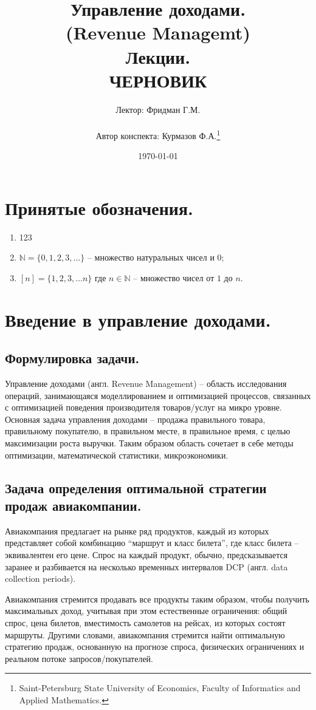 \documentclass[12pt, reqno]{article}
\title{Управление доходами.\\ (Revenue Managemt)\\ Лекции.\\ ЧЕРНОВИК}
\author{Лектор: Фридман Г.М.\\  \\ Автор конспекта: Курмазов Ф.А.\thanks{Saint-Petersburg State University of Economics, Faculty of Informatics and Applied Mathematics.}}
\date{\today}
\theoremstyle{definition}
\theoremstyle{definition}
\theoremstyle{definition}
\theoremstyle{definition}
\theoremstyle{definition}
\theoremstyle{definition}
\theoremstyle{definition}
\theoremstyle{definition}
\theoremstyle{definition}
\begin{document}
	\maketitle

	\tableofcontents

	
	\newpage
	\section{Принятые обозначения.}

		\begin{enumerate}
			\item 123
			\item $\mathds{N} = \{0, 1, 2, 3, ...\}$ -- множество натуральных чисел и $0$;
			\item $[n] = \{1, 2, 3, ... n\}$ где $n \in \mathds{N}$ -- множество чисел от $1$ до $n$.
		\end{enumerate}

	\newpage
	\section{Введение в управление доходами.}
		\subsection{Формулировка задачи.}
			
		Управление доходами (англ. Revenue Management) -- область исследования операций, занимающаяся моделлированием и оптимизацией процессов, связанных с оптимизацией поведения производителя товаров/услуг на микро уровне. Основная задача управления доходами -- продажа правильного товара, правильному покупателю, в правильном месте, в правильное время, с целью максимизации роста выручки. Таким образом область сочетает в себе методы оптимизации, математической статистики, микроэкономики.
		
		\subsection{Задача определения оптимальной стратегии продаж авиакомпании.}
			Авиакомпания предлагает на рынке ряд продуктов, каждый из которых представляет собой комбинацию ``маршрут и класс билета'', где класс билета -- эквивалентен его цене. Спрос на каждый продукт, обычно, предсказывается заранее и разбивается на несколько временных интервалов DCP (англ. data collection periods).
			
			Авиакомпания стремится продавать все продукты таким образом, чтобы получить максимальных доход, учитывая при этом естественные ограничения: общий спрос, цена билетов, вместимость самолетов на рейсах, из которых состоят маршруты. Другими словами, авиакомпания стремится найти оптимальную стратегию продаж, основанную на прогнозе спроса, физических ограничениях и реальном потоке запросов/покупателей.
		
\end{document}
